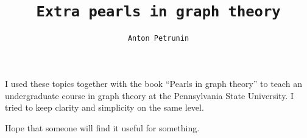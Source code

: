 \title{\tt Extra pearls in graph theory}
\author{\tt Anton Petrunin}
\date{}
\maketitle

I used these topics together with the book ``Pearls in graph theory'' \cite{pearls} to teach an undergraduate course in graph theory at the Pennsylvania State University.
I tried to keep clarity and simplicity on the same level.

Hope that someone will find it useful for something.

\null\vfill{}


\thispagestyle{empty}
\newpage
\tableofcontents